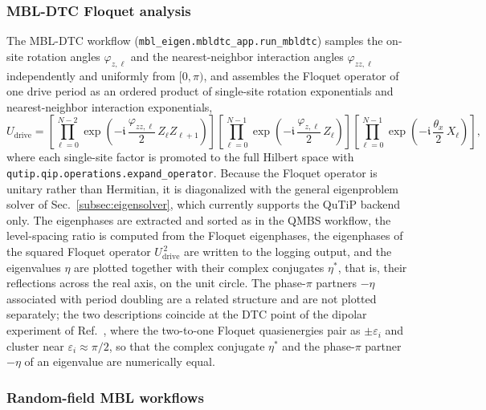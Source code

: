 \documentclass[longbibliography]{revtex4-2}
\newcommand{\im}[0]{\mathfrak{i}}
\begin{document}
\subsubsection{MBL-DTC Floquet analysis}

The MBL-DTC workflow (\texttt{mbl\_eigen.mbldtc\_app.run\_mbldtc})
samples the on-site rotation angles $\varphi_{z,\ell}$ and the
nearest-neighbor interaction angles $\varphi_{zz,\ell}$ independently
and uniformly from $[0, \pi)$, and assembles the Floquet operator of one
drive period as an ordered product of single-site rotation exponentials
and nearest-neighbor interaction exponentials,
\begin{equation}\label{eq:udrive-code}
    U_{\mathrm{drive}}
    = \left[\prod_{\ell=0}^{N-2}
      \exp\left(-\im\, \frac{\varphi_{zz,\ell}}{2}\,
      Z_{\ell} Z_{\ell+1}\right)\right]
    \left[\prod_{\ell=0}^{N-1}
      \exp\left(-\im\, \frac{\varphi_{z,\ell}}{2}\,
      Z_{\ell}\right)\right]
    \left[\prod_{\ell=0}^{N-1}
      \exp\left(-\im\, \frac{\theta_{x}}{2}\,
      X_{\ell}\right)\right],
\end{equation}
where each single-site factor is promoted to the full Hilbert space with
\texttt{qutip.qip.operations.expand\_operator}. Because the Floquet
operator is unitary rather than Hermitian, it is diagonalized with the
general eigenproblem solver of Sec.~\ref{subsec:eigensolver}, which
currently supports the QuTiP backend only. The eigenphases are extracted
and sorted as in the QMBS workflow, the level-spacing ratio is computed
from the Floquet eigenphases, the eigenphases of the squared Floquet
operator $U_{\mathrm{drive}}^{\,2}$ are written to the logging output,
and the eigenvalues $\eta$ are plotted together with their complex
conjugates $\eta^*$, that is, their reflections across the real axis,
on the unit circle. The phase-$\pi$ partners $-\eta$ associated with
period doubling are a related structure and are not plotted separately;
the two descriptions coincide at the DTC point of the dipolar
experiment of Ref.~\cite{choi2017observation}, where the two-to-one
Floquet quasienergies pair as $\pm \varepsilon_i$ and cluster near
$\varepsilon_i \approx \pi/2$, so that the complex conjugate $\eta^*$
and the phase-$\pi$ partner $-\eta$ of an eigenvalue are numerically
equal.

\subsubsection{Random-field MBL workflows}
\end{document}
